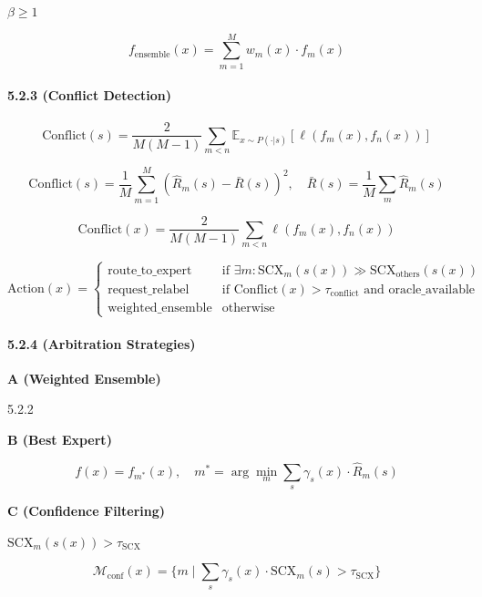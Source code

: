 \documentclass[
  12pt,
]{article}
\begin{document}
 \(\beta \geq 1\) 

\textbf{}

\[
f_{\text{ensemble}}(x) = \sum_{m=1}^M w_m(x) \cdot f_m(x)
\]

\paragraph{5.2.3  (Conflict
Detection)}\label{ux51b2ux7a81ux68c0ux6d4b-conflict-detection}

\textbf{}

\[
\text{Conflict}(s) = \frac{2}{M(M-1)} \sum_{m < n} \mathbb{E}_{x \sim P(\cdot|s)}[\ell(f_m(x), f_n(x))]
\]



\[
\text{Conflict}(s) = \frac{1}{M} \sum_{m=1}^M (\hat{R}_m(s) - \bar{R}(s))^2, \quad \bar{R}(s) = \frac{1}{M} \sum_m \hat{R}_m(s)
\]

\textbf{}

\[
\text{Conflict}(x) = \frac{2}{M(M-1)} \sum_{m < n} \ell(f_m(x), f_n(x))
\]

\textbf{}

\[
\text{Action}(x) = \begin{cases}
\text{route\_to\_expert} & \text{if } \exists m: \text{SCX}_m(s(x)) \gg \text{SCX}_{\text{others}}(s(x)) \\
\text{request\_relabel} & \text{if } \text{Conflict}(x) > \tau_{\text{conflict}} \text{ and } \text{oracle\_available} \\
\text{weighted\_ensemble} & \text{otherwise}
\end{cases}
\]

\paragraph{5.2.4  (Arbitration
Strategies)}\label{ux4ef2ux88c1ux7b56ux7565-arbitration-strategies}



\textbf{ A (Weighted Ensemble)}

 5.2.2 

\textbf{ B (Best Expert)}

\[
f(x) = f_{m^*}(x), \quad m^* = \arg\min_m \sum_s \gamma_s(x) \cdot \hat{R}_m(s)
\]

\textbf{ C (Confidence Filtering)}

 \(\text{SCX}_m(s(x)) > \tau_{\text{SCX}}\) 

\[
\mathcal{M}_{\text{conf}}(x) = \{ m \mid \sum_s \gamma_s(x) \cdot \text{SCX}_m(s) > \tau_{\text{SCX}} \}
\]
\end{document}
